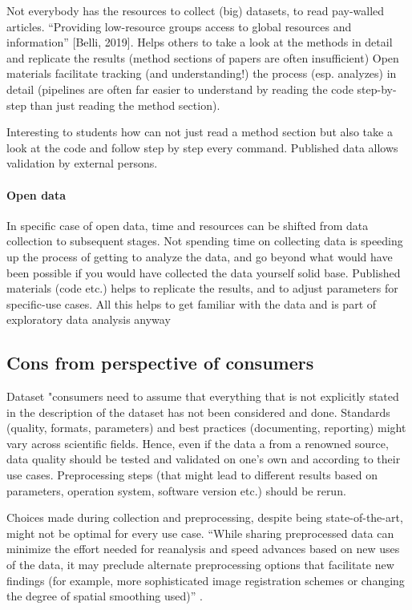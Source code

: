 %
Not everybody has the resources to collect (big) datasets, to read pay-walled
articles.
%
``Providing low-resource groups access to global resources and information''
[Belli, 2019].
%
Helps others to take a look at the methods in detail and replicate the results
(method sections of papers are often insufficient)
%
Open materials facilitate tracking (and understanding!) the process (esp.
analyzes) in detail (pipelines are often far easier to understand by reading the
code step-by-step than just reading the method section).

%
Interesting to students how can not just read a method section but also take a
look at the code and follow step by step every command.
%
Published data allows validation by external persons.



\paragraph{Open data}
%
In specific case of open data, time and resources can be shifted from data
collection to subsequent stages.
%
Not spending time on collecting data is speeding up the process of getting to
analyze the data, and go beyond what would have been possible if you would have
collected the data yourself solid base.
%
Published materials (code etc.) helps to replicate the results, and to adjust
parameters for specific-use cases.
%
All this helps to get familiar with the data and is part of exploratory data
analysis anyway


\subsection{Cons from perspective of consumers}

Dataset "consumers need to assume that everything that is not explicitly stated
in the description of the dataset has not been considered and done.
%
Standards (quality, formats, parameters) and best practices (documenting,
reporting) might vary across scientific fields.
%
Hence, even if the data a from a renowned source, data quality should be tested
and validated on one's own and according to their use cases.
%
Preprocessing steps (that might lead to different results based on parameters,
operation system, software version etc.) should be rerun.


Choices made during collection and preprocessing, despite being
state-of-the-art, might not be optimal for every use case.
%
``While sharing preprocessed data can minimize the effort needed for reanalysis
and speed advances based on new uses of the data, it may preclude alternate
preprocessing options that facilitate new findings (for example, more
sophisticated image registration schemes or changing the degree of spatial
smoothing used)'' \citep{nichols2017best}.

